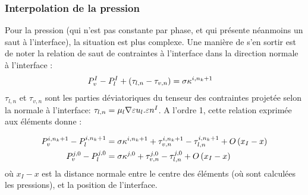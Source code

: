 \subsubsection{Interpolation de la pression}

Pour la pression (qui n'est pas constante par phase, et qui présente néanmoins un saut à l'interface), la situation est plus complexe. Une manière de s'en sortir est de noter la relation de saut de contraintes à l'interface dans la direction normale à l'interface :
\begin{align}
P_v^{I}-P_l^{I}+\left( \tau_{l,n}-\tau_{v,n}\right)&=\sigma\kappa^{i,n_k+1}\label{laplace1}
\end{align}
$\tau_{l,n}$ et $\tau_{v,n}$ sont les parties déviatoriques du tenseur des contraintes projetée selon la normale à l'interface: $\tau_{l,n} = \mu_l\nabla\varepsilon{u_l}.\varepsilon{n^I}$. A l'ordre 1, cette relation exprimée aux éléments donne :

\begin{align}
P_v^{i,n_k+1}-P_l^{i,n_k+1}&=\sigma\kappa^{i,n_k+1}+\tau_{v,n}^{i,n_k+1}-\tau_{l,n}^{i,n_k+1}+O\left( x_I-x\right)\label{laplace1}\\
P_v^{j,0}-P_l^{j,0}&=\sigma\kappa^{j,0}+\tau_{v,n}^{j,0}-\tau_{l,n}^{j,0}+O\left( x_I-x\right)\label{laplace2}
\end{align}
où $x_I-x$ est la distance normale entre le centre des éléments (où sont calculées les pressions), et la position de l'interface.

